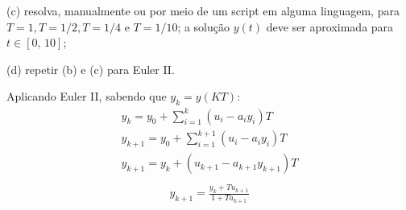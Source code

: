 \documentclass[10pt]{article}
\begin{document}
(c) resolva, manualmente ou por meio de um script em alguma linguagem, para $T = 1, T = 1/2, T = 1/4$ e $T = 1/10$; a solução $y(t)$ deve ser aproximada para $t \in [0, \, 10]$;



(d) repetir (b) e (c) para Euler II.

Aplicando Euler II, sabendo que $ y_k = y(KT) $:
\begin{align*}
    y_k = y_0 + \sum_{i=1}^{k} (u_i - a_i y_i)T\\
    y_{k+1} = y_0 + \sum_{i=1}^{k+1} (u_i - a_i y_i)T\\
    y_{k+1} = y_k + (u_{k+1} - a_{k+1} y_{k+1})T\\
\end{align*}
\begin{align*}
    y_{k+1} = \frac{y_k + Tu_{k+1}}{1 + Ta_{k+1}}
\end{align*}
\end{document}

